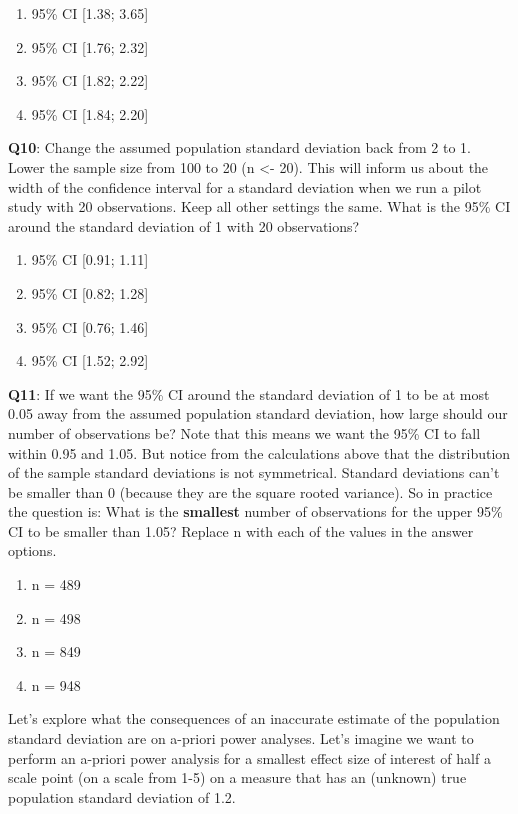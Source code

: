 \documentclass[
  oneside]{krantz}
\providecommand{\tightlist}{%
  \setlength{\itemsep}{0pt}\setlength{\parskip}{0pt}}
\begin{document}
\begin{enumerate}
\def\labelenumi{\Alph{enumi})}
\tightlist
\item
  95\% CI {[}1.38; 3.65{]}
\item
  95\% CI {[}1.76; 2.32{]}
\item
  95\% CI {[}1.82; 2.22{]}
\item
  95\% CI {[}1.84; 2.20{]}
\end{enumerate}

\textbf{Q10}: Change the assumed population standard deviation back from 2 to 1. Lower the sample size from 100 to 20 (n \textless- 20). This will inform us about the width of the confidence interval for a standard deviation when we run a pilot study with 20 observations. Keep all other settings the same. What is the 95\% CI around the standard deviation of 1 with 20 observations?

\begin{enumerate}
\def\labelenumi{\Alph{enumi})}
\tightlist
\item
  95\% CI {[}0.91; 1.11{]}
\item
  95\% CI {[}0.82; 1.28{]}
\item
  95\% CI {[}0.76; 1.46{]}
\item
  95\% CI {[}1.52; 2.92{]}
\end{enumerate}

\textbf{Q11}: If we want the 95\% CI around the standard deviation of 1 to be at most 0.05 away from the assumed population standard deviation, how large should our number of observations be? Note that this means we want the 95\% CI to fall within 0.95 and 1.05. But notice from the calculations above that the distribution of the sample standard deviations is not symmetrical. Standard deviations can't be smaller than 0 (because they are the square rooted variance). So in practice the question is: What is the \textbf{smallest} number of observations for the upper 95\% CI to be smaller than 1.05? Replace n with each of the values in the answer options.

\begin{enumerate}
\def\labelenumi{\Alph{enumi})}
\tightlist
\item
  n = 489
\item
  n = 498
\item
  n = 849
\item
  n = 948
\end{enumerate}

Let's explore what the consequences of an inaccurate estimate of the population standard deviation are on a-priori power analyses. Let's imagine we want to perform an a-priori power analysis for a smallest effect size of interest of half a scale point (on a scale from 1-5) on a measure that has an (unknown) true population standard deviation of 1.2.
\end{document}
